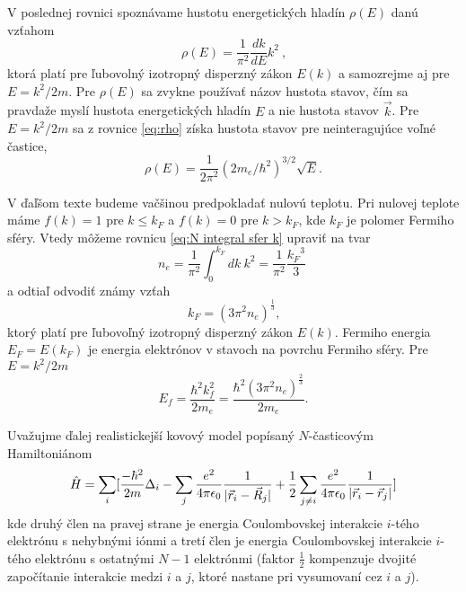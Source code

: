 V poslednej rovnici spoznávame hustotu energetických hladín $\rho(E)$ danú vzťahom
\begin{equation}
\label{eq:rho}
 \rho(E)=\frac{1}{\pi^2} \frac{dk}{dE} k^2  \ \text{,}
\end{equation}
ktorá platí pre ľubovolný izotropný disperzný zákon $E(k)$ a samozrejme aj pre $E = k^2/2m$.
Pre $\rho(E)$ sa zvykne používať názov hustota stavov, čím sa pravdaže
myslí hustota energetických hladín $E$ a nie hustota stavov $\vec k$.
Pre $E = k^2/2m$ sa z rovnice \eqref{eq:rho} získa
hustota stavov pre neinteragujúce voľné častice,
\begin{equation}
 \label{eq:rho_par}
 \rho(E)=\frac{1}{2\pi^2}{(2 m_e/\hbar^2)}^{3/2} \sqrt{E} \text{.}
\end{equation}


V ďaľšom texte 
budeme vačšinou predpokladať nulovú teplotu.
Pri nulovej teplote máme $f(k)=1$ pre $k \leq k_F$ a $f(k)=0$ pre $k > k_F$,
kde $k_F$ je polomer Fermiho sféry. Vtedy môžeme rovnicu \eqref{eq:N integral sfer k} upraviť na tvar
\begin{equation}
 \label{eq:N integral sfer k nula}
 n_e =   \frac{1}{\pi^2} \int_0^{k_F} dk \ k^2  = \frac{1}{\pi^2} \frac{{k_F}^3}{3} \ \text{}
\end{equation}
a odtiaľ odvodiť známy vzťah
\begin{equation}
 \label{eq:kf}
 k_F=(3\pi^2 n_e)^{\frac{1}{3}}\text{,}
\end{equation}
ktorý platí pre ľubovoľný izotropný disperzný zákon $E(k)$.
Fermiho energia $E_F=E(k_F)$ je energia elektrónov v stavoch na povrchu Fermiho sféry. Pre $E = k^2/2m$
\begin{equation}
 \label{eq:ef}
 E_f=\frac{\hbar^2 k_f^2}{2m_e}=\frac{\hbar^2(3\pi^2 n_e)^{\frac{2}{3}}  }{2m_e} \text{.}
\end{equation}

Uvažujme ďalej realistickejší kovový model popísaný $N$-časticovým Hamiltoniánom  
\begin{equation}
\label{eq:hrtf_ham}
\hat{H}=\sum_i [ \frac{-\hbar^2}{2m}\Delta_i  -\sum_j\frac{e^2}{4\pi \epsilon_0}{\frac{1}{|\vec{r}_i-\vec{R}_j|}} +\frac{1}{2}\sum_{j\neq i}\frac{e^2}{4\pi\epsilon_0}\frac{1}{|\vec{r}_i-\vec{r}_j|} ]
\end{equation}
kde druhý člen na pravej strane je energia Coulombovskej interakcie $i$-tého elektrónu s nehybnými iónmi a tretí člen je energia Coulombovskej interakcie $i$-tého elektrónu s ostatnými $N-1$ elektrónmi (faktor $\frac{1}{2}$ kompenzuje dvojité započítanie interakcie
medzi $i$ a $j$, ktoré nastane pri vysumovaní cez $i$ a $j$).

